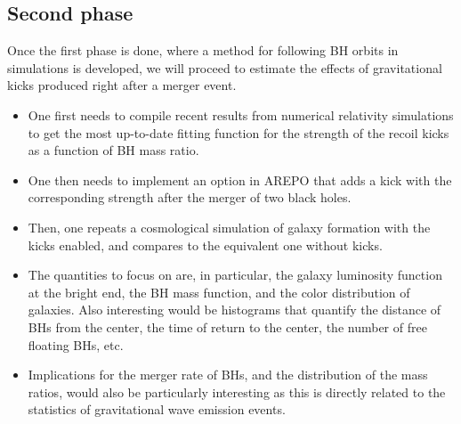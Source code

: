 \documentclass[a4,useAMS,usenatbib,usegraphicx,12pt]{article}
\begin{document}
\subsection*{Second phase}

Once the first phase is done, where a method for following BH orbits in simulations
is developed, we will proceed to estimate the effects of gravitational kicks 
produced right after a merger event.

\begin{itemize}

\item One first needs to compile recent results from numerical relativity 
simulations to get the most up-to-date fitting function for the strength of the 
recoil kicks as a function of BH mass ratio.
\item One then needs to implement an option in AREPO that adds a kick with the
corresponding strength after the merger of two black holes.
\item Then, one repeats a cosmological simulation of galaxy formation with the 
kicks enabled, and compares to the equivalent one without kicks.
\item The quantities to focus on are, in particular, the galaxy luminosity 
function at the bright end, the BH mass function, and the color distribution of 
galaxies. Also interesting would be histograms that quantify the distance of BHs 
from the center, the time of return to the center, the number of free floating 
BHs, etc.
\item Implications for the merger rate of BHs, and the distribution of the mass 
ratios, would also be particularly interesting as this is directly related to 
the statistics of gravitational wave emission events.

\end{itemize}

\newpage

\renewcommand{\bibname}{8\ \ \ \ Bibliography}
\small



\newpage

\end{document}
